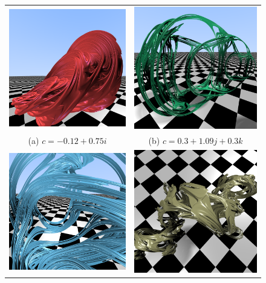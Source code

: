 \begin{figure}[ht]
    \centering
    \begin{tabular}{cc}
      \includegraphics[width=6.5cm]{img/C9/julia-1.png} &     \includegraphics[width=6.5cm]{img/C9/julia-2.png} \\
    (a) $c=-0.12+0.75 i$ & (b) $c=0.3+1.09j+0.3k$ \\[6pt]
    \includegraphics[width=6.5cm]{img/C9/julia-3.png} &     \includegraphics[width=6.5cm]{img/C9/julia-4.png} \\

\end{tabular}
\end{figure}
